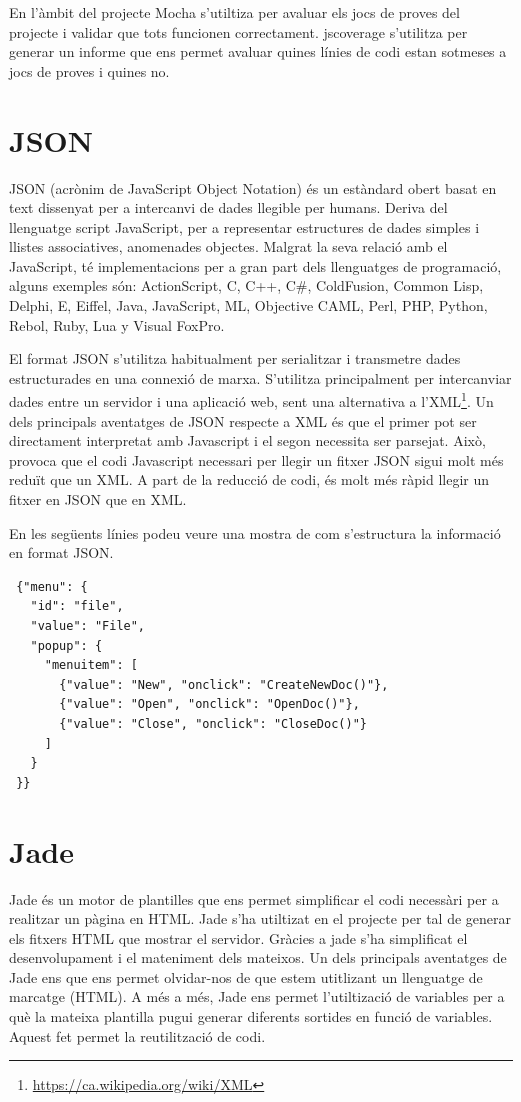 En l'àmbit del projecte Mocha s'utiltiza per avaluar els jocs de proves del projecte i validar que tots funcionen correctament. jscoverage s'utilitza per generar un informe que ens permet avaluar quines línies de codi estan sotmeses a jocs de proves i quines no.

\section{JSON}
\label{sec:json}

JSON (acrònim de JavaScript Object Notation) és un estàndard obert basat en text dissenyat per a intercanvi de dades llegible per humans. Deriva del llenguatge script JavaScript, per a representar estructures de dades simples i llistes associatives, anomenades objectes. Malgrat la seva relació amb el JavaScript, té implementacions per a gran part dels llenguatges de programació, alguns exemples són: ActionScript, C, C++, C\#, ColdFusion, Common Lisp, Delphi, E, Eiffel, Java, JavaScript, ML, Objective CAML, Perl, PHP, Python, Rebol, Ruby, Lua y Visual FoxPro. 

El format JSON s'utilitza habitualment per serialitzar i transmetre dades estructurades en una connexió de marxa. S'utilitza principalment per intercanviar dades entre un servidor i una aplicació web, sent una alternativa a l'XML\footnote{\url{https://ca.wikipedia.org/wiki/XML}}. Un dels principals aventatges de JSON respecte a XML és que el primer pot ser directament interpretat amb Javascript i el segon necessita ser parsejat. Això, provoca que el codi Javascript necessari per llegir un fitxer JSON sigui molt més reduït que un XML. A part de la reducció de codi, és molt més ràpid llegir un fitxer en JSON que en XML. 

En les següents línies podeu veure una mostra de com s'estructura la informació en format JSON. 

\begin{lstlisting}
 {"menu": {
   "id": "file",
   "value": "File",
   "popup": {
     "menuitem": [
       {"value": "New", "onclick": "CreateNewDoc()"},
       {"value": "Open", "onclick": "OpenDoc()"},
       {"value": "Close", "onclick": "CloseDoc()"}
     ]
   }
 }}
\end{lstlisting}


\section{Jade}

Jade és un motor de plantilles que ens permet simplificar el codi necessàri per a realitzar un pàgina en HTML. Jade s'ha utiltizat en el projecte per tal de generar els fitxers HTML que mostrar el servidor. Gràcies a jade s'ha simplificat el desenvolupament i el mateniment dels mateixos. Un dels principals aventatges de Jade ens que ens permet olvidar-nos de que estem utitlizant un llenguatge de marcatge (HTML). A més a més, Jade ens permet l'utiltizació de variables per a què la mateixa plantilla pugui generar diferents sortides en funció de variables. Aquest fet permet la reutilització de codi.

